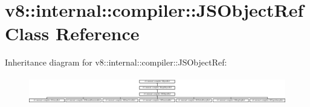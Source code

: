 \hypertarget{classv8_1_1internal_1_1compiler_1_1JSObjectRef}{}\section{v8\+:\+:internal\+:\+:compiler\+:\+:J\+S\+Object\+Ref Class Reference}
\label{classv8_1_1internal_1_1compiler_1_1JSObjectRef}
Inheritance diagram for v8\+:\+:internal\+:\+:compiler\+:\+:J\+S\+Object\+Ref\+:\begin{figure}[H]
\begin{center}
\leavevmode
\includegraphics[height=1.226054cm]{classv8_1_1internal_1_1compiler_1_1JSObjectRef}
\end{center}
\end{figure}

